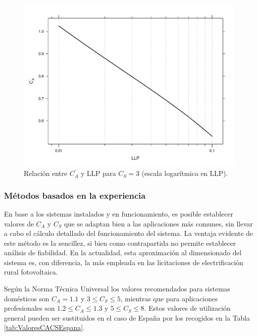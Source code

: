 %
\begin{figure}
\includegraphics[scale=0.75]{../figs/CurvasLLP_Cs3}

\caption[Relación entre $C_{A}^{'}$ y LLP]{Relación entre $C_{A}^{'}$ y LLP para $C_{S}=3$ (escala logarítmica
en LLP).\label{fig:Ca_LLP_Cs3}}

\end{figure}



\subsubsection{Métodos basados en la experiencia}

En base a los sistemas instalados y en funcionamiento, es posible
establecer valores de $C_{A}$ y $C_{S}$ que se adaptan bien a las
aplicaciones más comunes, sin llevar a cabo el cálculo detallado del
funcionamiento del sistema. La ventaja evidente de este método es
la sencillez, si bien como contrapartida no permite establecer análisis
de fiabilidad. En la actualidad, esta aproximación al dimensionado
del sistema es, con diferencia, la más empleada en las licitaciones
de electrificación rural fotovoltaica.

Según la Norma Técnica Universal \cite{Egido.Lorenzo1998} los valores
recomendados para sistemas domésticos son $C_{A}=1.1$ y $3\leq C_{S}\leq5$,
mientras que para aplicaciones profesionales son $1.2\leq C_{A}\leq1.3$
y $5\leq C_{S}\leq8$. Estos valores de utilización general pueden
ser sustituidos en el caso de España por los recogidos en la Tabla
\ref{tab:ValoresCACSEspana}.

